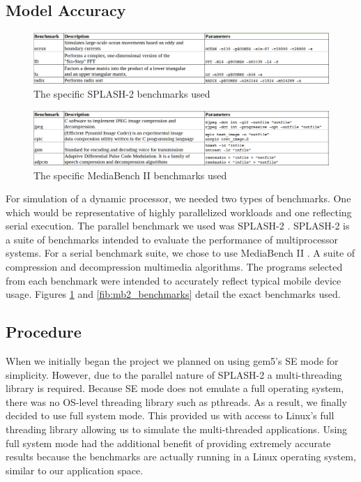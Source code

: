 \subsection{Model Accuracy}
\begin{figure}
    \centering
    \includegraphics[scale=0.3]{../images/splash2.png}
    \caption{The specific SPLASH-2 benchmarks used}
    \label{fig:splash2_benchmarks}
\end{figure}

\begin{figure}
    \centering
    \includegraphics[scale=0.3]{../images/mb2.png}
    \caption{The specific MediaBench II benchmarks used}
    \label{fig:mb2_benchmarks}
\end{figure}
For simulation of a dynamic processor, we needed two types of benchmarks. One which would be representative of highly parallelized workloads and one reflecting serial execution. The parallel benchmark we used was SPLASH-2 \cite{splash2}. SPLASH-2 is a suite of benchmarks intended to evaluate the performance of multiprocessor systems. For a serial benchmark suite, we chose to use MediaBench II \cite{mb2}. A suite of compression and decompression multimedia algorithms. The programs selected from each benchmark were intended to accurately reflect typical mobile device usage. Figures \ref{fig:splash2_benchmarks} and \ref{fib:mb2_benchmarks} detail the exact benchmarks used.

\subsection{Procedure}
When we initially began the project we planned on using gem5's SE mode for simplicity. However, due to the parallel nature of SPLASH-2 a multi-threading library is required. Because SE mode does not emulate a full operating system, there was no OS-level threading library such as pthreads. As a result, we finally decided to use full system mode. This provided us with access to Linux's full threading library allowing us to simulate the multi-threaded applications. Using full system mode had the additional benefit of providing extremely accurate results because the benchmarks are actually running in a Linux operating system, similar to our application space.

